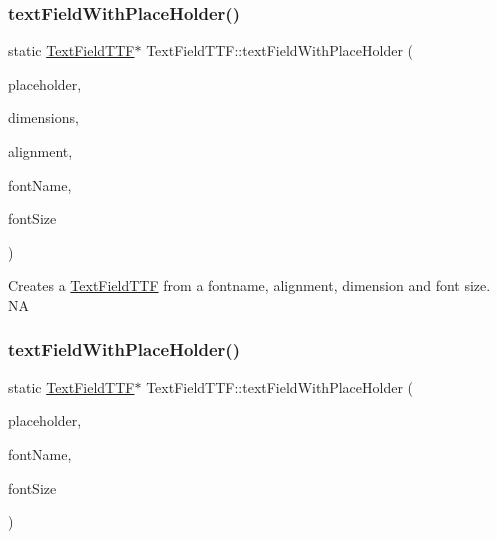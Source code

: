 \subsubsection{\texorpdfstring{text\+Field\+With\+Place\+Holder()}{textFieldWithPlaceHolder()}\hspace{0.1cm}{\footnotesize\ttfamily [1/4]}}
{\footnotesize\ttfamily static \hyperlink{classTextFieldTTF}{Text\+Field\+T\+TF}$\ast$ Text\+Field\+T\+T\+F\+::text\+Field\+With\+Place\+Holder (\begin{DoxyParamCaption}\item[{const std\+::string \&}]{placeholder,  }\item[{const \hyperlink{classSize}{Size} \&}]{dimensions,  }\item[{Text\+H\+Alignment}]{alignment,  }\item[{const std\+::string \&}]{font\+Name,  }\item[{float}]{font\+Size }\end{DoxyParamCaption})\hspace{0.3cm}{\ttfamily [static]}}

Creates a \hyperlink{classTextFieldTTF}{Text\+Field\+T\+TF} from a fontname, alignment, dimension and font size.  NA \mbox{\label{classTextFieldTTF_af5bdaba3727ac446fbaf714b799aee19}} 
\subsubsection{\texorpdfstring{text\+Field\+With\+Place\+Holder()}{textFieldWithPlaceHolder()}\hspace{0.1cm}{\footnotesize\ttfamily [2/4]}}
{\footnotesize\ttfamily static \hyperlink{classTextFieldTTF}{Text\+Field\+T\+TF}$\ast$ Text\+Field\+T\+T\+F\+::text\+Field\+With\+Place\+Holder (\begin{DoxyParamCaption}\item[{const std\+::string \&}]{placeholder,  }\item[{const std\+::string \&}]{font\+Name,  }\item[{float}]{font\+Size }\end{DoxyParamCaption})\hspace{0.3cm}{\ttfamily [static]}}

